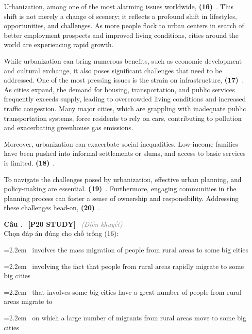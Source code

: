 \documentclass[12pt,a4paper,twoside]{article}
\newcounter{qcounter}
\newcommand{\question}[2][]{%
    \stepcounter{qcounter}%
    \par\vspace{6pt}%
    \noindent\textcolor{primaryBlue}{\textbf{Câu \theqcounter.}}~%
    \textcolor{secondaryBlue}{\small\textbf{[P20 STUDY]}}~%
    \if\relax\detokenize{#1}\relax\else\textcolor{gray}{\small\textit{(#1)}}~\fi\\[1pt]
    \noindent #2%
}
\newcommand{\choiceitem}[2]{%
    \tikz[baseline=-0.5ex]{%
        \node[draw=primaryBlue, circle, minimum size=1.5em, inner sep=0pt, thick] {\textbf{#1}};%
    }~#2%
}
\newenvironment{readingpassage}[1][]{%
    \begin{tcolorbox}[enhanced, colback=grayLight, colframe=secondaryBlue,
        coltitle=textDark, fonttitle=\bfseries, title={#1},
        rounded corners, arc=3mm, boxrule=1pt,
        left=15pt, right=15pt, top=10pt, bottom=10pt,
        breakable, before skip=10pt, after skip=10pt, drop fuzzy shadow]
    \setstretch{1.3}
}{\end{tcolorbox}}
\begin{document}
\begin{readingpassage}[]
Urbanization, among one of the most alarming issues worldwide, \textbf{(16)}~\underline{\hspace{1.3cm}}. This shift is not merely a change of scenery; it reflects a profound shift in lifestyles, opportunities, and challenges. As more people flock to urban centers in search of better employment prospects and improved living conditions, cities around the world are experiencing rapid growth.

While urbanization can bring numerous benefits, such as economic development and cultural exchange, it also poses significant challenges that need to be addressed. One of the most pressing issues is the strain on infrastructure, \textbf{(17)}~\underline{\hspace{1.3cm}}. As cities expand, the demand for housing, transportation, and public services frequently exceeds supply, leading to overcrowded living conditions and increased traffic congestion. Many major cities, which are grappling with inadequate public transportation systems, force residents to rely on cars, contributing to pollution and exacerbating greenhouse gas emissions.

Moreover, urbanization can exacerbate social inequalities. Low-income families have been pushed into informal settlements or slums, and access to basic services is limited. \textbf{(18)}~\underline{\hspace{1.3cm}}.

To navigate the challenges posed by urbanization, effective urban planning, and policy-making are essential. \textbf{(19)}~\underline{\hspace{1.3cm}}. Furthermore, engaging communities in the planning process can foster a sense of ownership and responsibility. Addressing these challenges head-on, \textbf{(20)}~\underline{\hspace{1.3cm}}.
\end{readingpassage}

\question[Điền khuyết]{Chọn đáp án đúng cho chỗ trống (16):}

\par\vspace{4pt}
\noindent\hangindent=2.2em\choiceitem{A}{involves the mass migration of people from rural areas to some big cities}\par\vspace{4pt}
\noindent\hangindent=2.2em\choiceitem{B}{involving the fact that people from rural areas rapidly migrate to some big cities}\par\vspace{4pt}
\noindent\hangindent=2.2em\choiceitem{C}{that involves some big cities have a great number of people from rural areas migrate to}\par\vspace{4pt}
\noindent\hangindent=2.2em\choiceitem{D}{on which a large number of migrants from rural areas move to some big cities}\par\vspace{4pt}
\end{document}
